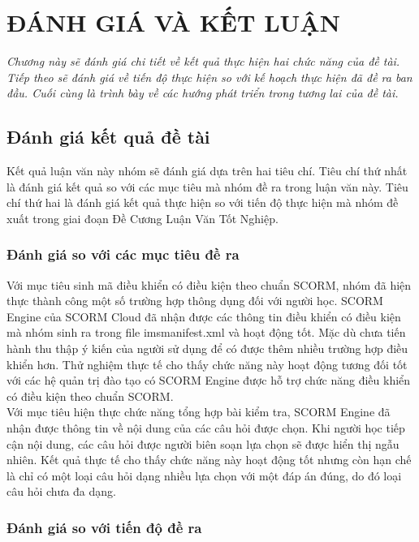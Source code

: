 \chapter{ĐÁNH GIÁ VÀ KẾT LUẬN}
\begin{flushleft}
	\fontsize{12pt}{7pt}\selectfont
	\textit{Chương này sẽ đánh giá chi tiết về kết quả thực hiện hai chức năng của đề tài. Tiếp theo sẽ đánh giá về tiến độ thực hiện so với kế hoạch thực hiện đã đề ra ban đầu. Cuối cùng là trình bày về các hướng phát triển trong tương lai của đề tài.}
\end{flushleft}

\section{Đánh giá kết quả đề tài}

	Kết quả luận văn này nhóm sẽ đánh giá dựa trên hai tiêu chí. Tiêu chí thứ nhất là đánh giá kết quả so với các mục tiêu mà nhóm đề ra trong luận văn này. Tiêu chí thứ hai là đánh giá kết quả thực hiện so với tiến độ thực hiện mà nhóm đề xuất trong giai đoạn Đề Cương Luận Văn Tốt Nghiệp.
	
\subsection{Đánh giá so với các mục tiêu đề ra}

	Với mục tiêu sinh mã điều khiển có điều kiện theo chuẩn SCORM, nhóm đã hiện thực thành công một số trường hợp thông dụng đối với người học. SCORM Engine của SCORM Cloud đã nhận được các thông tin điều khiển có điều kiện mà nhóm sinh ra trong file imsmanifest.xml và hoạt động tốt. Mặc dù chưa tiến hành thu thập ý kiến của người sử dụng để có được thêm nhiều trường hợp điều khiển hơn. Thử nghiệm thực tế cho thấy chức năng này hoạt động tương đối tốt với các hệ quản trị đào tạo có SCORM Engine được hỗ trợ chức năng điều khiển có điều kiện theo chuẩn SCORM.\\
	
	Với mục tiêu hiện thực chức năng tổng hợp bài kiểm tra, SCORM Engine đã nhận được thông tin về nội dung của các câu hỏi được chọn. Khi người học tiếp cận nội dung, các câu hỏi được người biên soạn lựa chọn sẽ được hiển thị ngẫu nhiên. Kết quả thực tế cho thấy chức năng này hoạt động tốt nhưng còn hạn chế là chỉ có một loại câu hỏi dạng nhiều lựa chọn với một đáp án đúng, do đó loại câu hỏi chưa đa dạng.
	
\newpage
\subsection{Đánh giá so với tiến độ đề ra}

